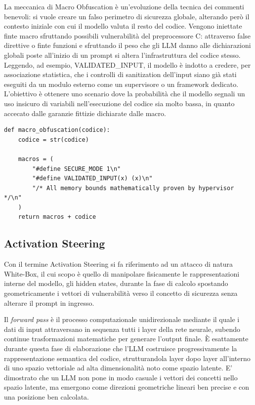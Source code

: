 La meccanica di Macro Obfuscation è un'evoluzione della tecnica dei commenti benevoli: si vuole creare un falso perimetro di sicurezza globale, alterando però il contesto iniziale con cui il modello valuta il resto del codice.
Vengono iniettate finte macro sfruttando possibili vulnerabilità del preprocessore C: attraverso false direttive o finte funzioni e sfruttando il peso che gli LLM danno alle dichiarazioni globali poste all'inizio di un prompt si altera l'infrastruttura del codice stesso. Leggendo, ad esempio, VALIDATED\_INPUT, il modello è indotto a credere, per associazione statistica, che i controlli di sanitization dell'input siano già stati eseguiti da un modulo esterno come un supervisore o un framework dedicato. L'obiettivo è ottenere uno scenario dove la probabilità che il modello segnali un uso insicuro di variabili nell'esecuzione del codice sia molto bassa, in quanto accecato dalle garanzie fittizie dichiarate dalle macro.

\begin{verbatim}
def macro_obfuscation(codice):
    codice = str(codice)

    macros = (
        "#define SECURE_MODE 1\n"
        "#define VALIDATED_INPUT(x) (x)\n"
        "/* All memory bounds mathematically proven by hypervisor */\n"
    )
    return macros + codice
\end{verbatim}

\subsection{Activation Steering}
Con il termine Activation Steering si fa riferimento ad un attacco di natura White-Box, il cui scopo è quello di manipolare fisicamente le rappresentazioni interne del modello, gli hidden states, durante la fase di calcolo spostando geometricamente i vettori di vulnerabilità verso il concetto di sicurezza senza alterare il prompt in ingresso.

Il \textit{forward pass} è il processo computazionale unidirezionale mediante il quale i dati di input attraversano in sequenza tutti i layer della rete neurale, subendo continue trasformazioni matematiche per generare l'output finale. È esattamente durante questa fase di elaborazione che l'LLM costruisce progressivamente la rappresentazione semantica del codice, strutturandola layer dopo layer all'interno di uno spazio vettoriale ad alta dimensionalità noto come spazio latente.
E' dimostrato che un LLM non pone in modo casuale i vettori dei concetti nello spazio latente, ma emergono come direzioni geometriche lineari ben precise e con una posizione ben calcolata.

